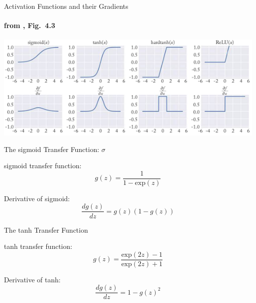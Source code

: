 \begin{frame}{Activation Functions and their Gradients}
\framesubtitle{from \cite{Goldberg2017}, Fig.\ 4.3}
\begin{block}{}
\centering
\includegraphics[scale=0.55]{figures/ff/activationfns.png}
\end{block}
\end{frame}



\begin{frame}{The sigmoid Transfer Function: $\sigma$}
\begin{block}{sigmoid transfer function:}
\[ g(z) = \frac{1}{1 - \textrm{exp}(z)} \]
\end{block}

\pause
\begin{block}{Derivative of sigmoid:}
\[ \frac{d g(z)}{dz} = g(z) (1 - g(z)) \]
\end{block}
\end{frame}
 
\begin{frame}{The tanh Transfer Function}
\begin{block}{tanh transfer function:}
\[ g(z) = \frac {\textrm{exp}(2z) - 1}{\textrm{exp}(2z) + 1} \]
\end{block}

\pause
\begin{block}{Derivative of tanh:}
\[ \frac{d g(z)}{dz} = 1 - g(z)^2 \]
\end{block}

\end{frame}

